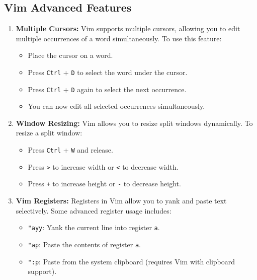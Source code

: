 \documentclass{article}
\begin{document}
\subsection{Vim Advanced Features}
\begin{enumerate}
    \item \textbf{Multiple Cursors:} Vim supports multiple cursors, allowing you to edit multiple occurrences of a word simultaneously. To use this feature:
    
    \begin{itemize}
        \item Place the cursor on a word.
        \item Press \texttt{Ctrl} + \texttt{D} to select the word under the cursor.
        \item Press \texttt{Ctrl} + \texttt{D} again to select the next occurrence.
        \item You can now edit all selected occurrences simultaneously.
    \end{itemize}

    \item \textbf{Window Resizing:} Vim allows you to resize split windows dynamically. To resize a split window:
    
    \begin{itemize}
        \item Press \texttt{Ctrl} + \texttt{W} and release.
        \item Press \texttt{>} to increase width or \texttt{<} to decrease width.
        \item Press \texttt{+} to increase height or \texttt{-} to decrease height.
    \end{itemize}

    \item \textbf{Vim Registers:} Registers in Vim allow you to yank and paste text selectively. Some advanced register usage includes:
    
    \begin{itemize}
        \item \texttt{"ayy}: Yank the current line into register \texttt{a}.
        \item \texttt{"ap}: Paste the contents of register \texttt{a}.
        \item \texttt{":p}: Paste from the system clipboard (requires Vim with clipboard support).
    \end{itemize}
\end{enumerate}
\end{document}
